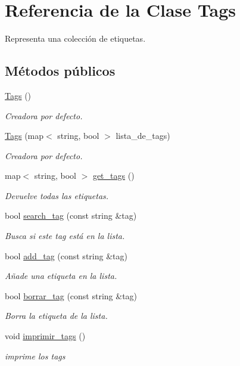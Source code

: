\hypertarget{class_tags}{\section{Referencia de la Clase Tags}
\label{class_tags}
}


Representa una colección de etiquetas.  


\subsection*{Métodos públicos}
\begin{DoxyCompactItemize}
\item 
\hyperlink{class_tags_a8d3045112662e0ace4b8bafb5a3e8f57}{Tags} ()
\begin{DoxyCompactList}\small\item\em Creadora por defecto. \end{DoxyCompactList}\item 
\hyperlink{class_tags_a55e22736b43fd945ac900a50a3c67509}{Tags} (map$<$ string, bool $>$ lista\-\_\-de\-\_\-tags)
\begin{DoxyCompactList}\small\item\em Creadora por defecto. \end{DoxyCompactList}\item 
map$<$ string, bool $>$ \hyperlink{class_tags_a811129b11acf0ae9c6f224a386075e46}{get\-\_\-tags} ()
\begin{DoxyCompactList}\small\item\em Devuelve todas las etiquetas. \end{DoxyCompactList}\item 
bool \hyperlink{class_tags_aff44c4ae5a949512c893d1fc9ab5312a}{search\-\_\-tag} (const string \&tag)
\begin{DoxyCompactList}\small\item\em Busca si este tag está en la lista. \end{DoxyCompactList}\item 
bool \hyperlink{class_tags_ab4220617f466486577ab9699c0b2d8c7}{add\-\_\-tag} (const string \&tag)
\begin{DoxyCompactList}\small\item\em Añade una etiqueta en la lista. \end{DoxyCompactList}\item 
bool \hyperlink{class_tags_a7a2f42e0533c7ef830fba59a62939a3d}{borrar\-\_\-tag} (const string \&tag)
\begin{DoxyCompactList}\small\item\em Borra la etiqueta de la lista. \end{DoxyCompactList}\item 
void \hyperlink{class_tags_ade593708dde12c2ca24903fee2092ada}{imprimir\-\_\-tags} ()
\begin{DoxyCompactList}\small\item\em imprime los tags \end{DoxyCompactList}\end{DoxyCompactItemize}


